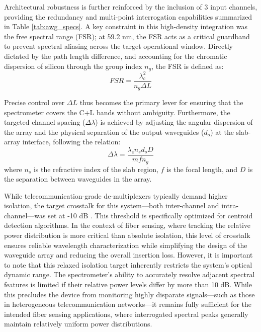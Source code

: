 Architectural robustness is further reinforced by the inclusion of 3 input channels, providing the 
redundancy and multi-point interrogation capabilities summarized in Table \ref{tab:awg_specs}. A 
key constraint in this high-density integration was the free spectral range (FSR); at 59.2 nm, the 
FSR acts as a critical guardband to prevent spectral aliasing across the target operational window.
Directly dictated by the path length difference, and accounting for the chromatic dispersion of 
silicon through the group index $n_g$, the FSR is defined as:
\begin{equation}
    FSR = \frac{\lambda_c^2}{n_g \Delta L}
\end{equation}

Precise control over $\Delta L$ thus becomes the primary lever for ensuring that the spectrometer 
covers the C+L bands without ambiguity. Furthermore, the targeted channel spacing 
($\Delta \lambda$) is achieved by adjusting the angular dispersion of the array and the physical 
separation of the output waveguides ($d_o$) at the slab-array interface, following the relation:
\begin{equation}
    \Delta \lambda = \frac{\lambda_c n_s d_o D}{m f n_g}
\end{equation}
where $n_s$ is the refractive index of the slab region, $f$ is the focal length, and $D$ is the 
separation between waveguides in the array.

While telecommunication-grade de-multiplexers typically demand higher isolation, the target 
crosstalk for this system—both inter-channel and intra-channel—was set at -10 dB 
\cite{wangLowlossLowcrosstalk82014}. This threshold is specifically optimized for centroid 
detection algorithms. In the context of fiber sensing, where tracking the relative power 
distribution is more critical than absolute isolation, this level of crosstalk ensures reliable 
wavelength characterization while simplifying the design of the waveguide array and reducing the 
overall insertion loss. However, it is important to note that this relaxed isolation target 
inherently restricts the system's optical dynamic range. The spectrometer's ability to accurately 
resolve adjacent spectral features is limited if their relative power levels differ by more than 10 
dB. While this precludes the device from monitoring highly disparate signals—such as those in 
heterogeneous telecommunication networks—it remains fully sufficient for the intended fiber sensing 
applications, where interrogated spectral peaks generally maintain relatively uniform power 
distributions.

